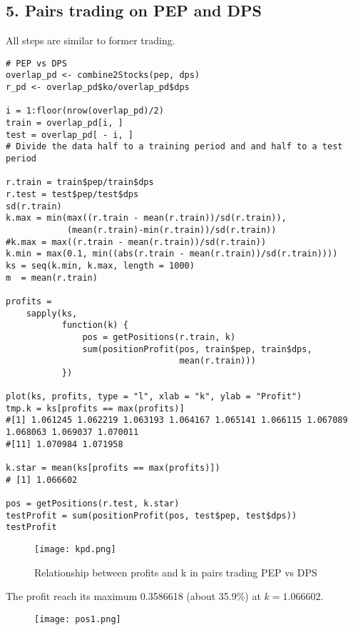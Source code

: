 \documentclass{article}
\begin{document}
\subsection*{5. Pairs trading on PEP and DPS}
All steps are similar to former trading.
\begin{verbatim}
# PEP vs DPS
overlap_pd <- combine2Stocks(pep, dps)
r_pd <- overlap_pd$ko/overlap_pd$dps

i = 1:floor(nrow(overlap_pd)/2)
train = overlap_pd[i, ]
test = overlap_pd[ - i, ]
# Divide the data half to a training period and and half to a test period

r.train = train$pep/train$dps
r.test = test$pep/test$dps
sd(r.train)
k.max = min(max((r.train - mean(r.train))/sd(r.train)), 
            (mean(r.train)-min(r.train))/sd(r.train))
#k.max = max((r.train - mean(r.train))/sd(r.train))
k.min = max(0.1, min((abs(r.train - mean(r.train))/sd(r.train))))
ks = seq(k.min, k.max, length = 1000)
m  = mean(r.train)

profits =
    sapply(ks,
           function(k) {
               pos = getPositions(r.train, k)
               sum(positionProfit(pos, train$pep, train$dps, 
                                  mean(r.train)))
           })

plot(ks, profits, type = "l", xlab = "k", ylab = "Profit")
tmp.k = ks[profits == max(profits)]  
#[1] 1.061245 1.062219 1.063193 1.064167 1.065141 1.066115 1.067089 1.068063 1.069037 1.070011
#[11] 1.070984 1.071958

k.star = mean(ks[profits == max(profits)])
# [1] 1.066602

pos = getPositions(r.test, k.star)
testProfit = sum(positionProfit(pos, test$pep, test$dps)) 
testProfit
\end{verbatim}

\begin{figure}[H] 
\begin{center} 
\texttt{[image: kpd.png]}  
\caption{Relationship between profits and k in pairs trading PEP vs DPS} 
\end{center} 
\end{figure}
The profit reach its maximum 0.3586618 (about 35.9\%) at $k=1.066602$.
\begin{figure}[H] 
\begin{center} 
\texttt{[image: pos1.png]}  
\end{center} 
\end{figure}
\end{document}
